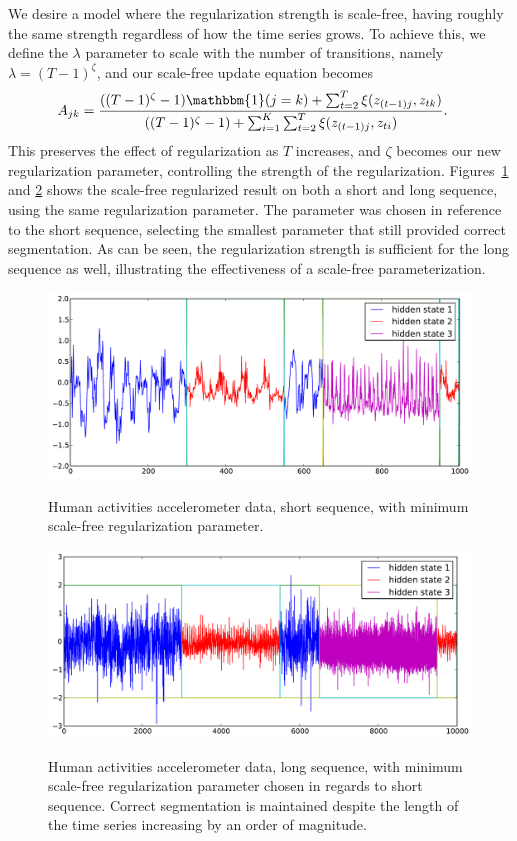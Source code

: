 \documentclass[12pt]{article}
\begin{document}
We desire a model where the regularization strength is scale-free, having roughly the same strength regardless of how the time series grows. To achieve this, we define the $\lambda$ parameter to scale with the number of transitions, namely $\lambda = (T-1)^\zeta$, and our scale-free update equation becomes
\begin{align}\label{eq:SCALE-FREE-MAP}
    A_{jk} &= \frac{((T - 1)^{\zeta}-1){\mathbbm{1}(j = k)} + \sum_{t=2}^{T} \xi(z_{(t-1)j}, z_{tk})}   
    {((T - 1)^{\zeta} - 1) + \sum_{i=1}^{K}\sum_{t=2}^{T} \xi(z_{(t-1)j}, z_{ti})}.
\end{align}
This preserves the effect of regularization as $T$ increases, and $\zeta$ becomes our new regularization parameter, controlling the strength of the regularization. Figures~\ref{fig:short-real-data-scale-free} and \ref{fig:long-real-data-scale-free} shows the scale-free regularized result on both a short and long sequence, using the same regularization parameter. The parameter was chosen in reference to the short sequence, selecting the smallest parameter that still provided correct segmentation. As can be seen, the regularization strength is sufficient for the long sequence as well, illustrating the effectiveness of a scale-free parameterization.

\begin{figure}[htbp]
  \caption{Human activities accelerometer data, short sequence, with minimum scale-free regularization parameter.}
  \centering
    \includegraphics[width=.8\linewidth]{images/MAP_SCALE_FREE_results_hard_activity_short_3_states.pdf}
    \label{fig:short-real-data-scale-free}
\end{figure}

\begin{figure}[htbp]
  \caption{Human activities accelerometer data, long sequence, with minimum scale-free regularization parameter chosen in regards to short sequence. Correct segmentation is maintained despite the length of the time series increasing by an order of magnitude.}
  \centering
    \includegraphics[width=.8\linewidth]{images/MAP_SCALE_FREE_results_hard_activity_long_3_states.pdf}
    \label{fig:long-real-data-scale-free}
\end{figure}
\end{document}
